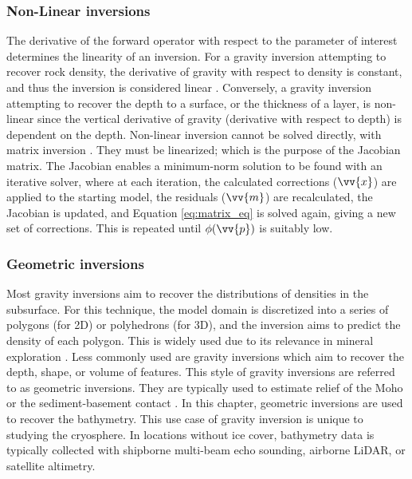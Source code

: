 \subsubsection{Non-Linear inversions}

The derivative of the forward operator with respect to the parameter of interest determines the linearity of an inversion. For a gravity inversion attempting to recover rock density, the derivative of gravity with respect to density is constant, and thus the inversion is considered linear \citep{asterparameter2018}. Conversely, a gravity inversion attempting to recover the depth to a surface, or the thickness of a layer, is non-linear since the vertical derivative of gravity (derivative with respect to depth) is dependent on the depth. Non-linear inversion cannot be solved directly, with matrix inversion \citep{jacobygravity2009}. They must be linearized; which is the purpose of the Jacobian matrix. The Jacobian enables a minimum-norm solution to be found with an iterative solver, where at each iteration, the calculated corrections ($\vv{x}$) are applied to the starting model, the residuals ($\vv{m}$) are recalculated, the Jacobian is updated, and Equation \ref{eq:matrix_eq} is solved again, giving a new set of corrections. This is repeated until $\phi(\vv{p})$ is suitably low.

\subsubsection{Geometric inversions}
Most gravity inversions aim to recover the distributions of densities in the subsurface. For this technique, the model domain is discretized into a series of polygons (for 2D) or polyhedrons (for 3D), and the inversion aims to predict the density of each polygon. This is widely used due to its relevance in mineral exploration \citep{oldenburggeophysical2007}. Less commonly used are gravity inversions which aim to recover the depth, shape, or volume of features. This style of gravity inversions are referred to as geometric inversions. They are typically used to estimate relief of the Moho \citep[e.g][]{uiedafast2017, borghimoho2022} or the sediment-basement contact \citep[e.g.][]{santosefficient2015, barbosagravity2007}. In this chapter, geometric inversions are used to recover the bathymetry. This use case of gravity inversion is unique to studying the cryosphere. In locations without ice cover, bathymetry data is typically collected with shipborne multi-beam echo sounding, airborne LiDAR, or satellite altimetry. 


